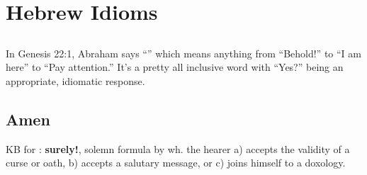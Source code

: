 \section{Hebrew Idioms}\label{app:idioms}\thispagestyle{fancy}
\subsection{}
In Genesis 22:1, Abraham says ``'' which means anything from ``Behold!'' to ``I am here'' to ``Pay attention.'' It's a pretty all inclusive word with ``Yes?'' being an appropriate, idiomatic response.

\subsection{Amen}
KB for : \textbf{surely!}, solemn formula by wh\@. the hearer a) accepts the validity of a curse or oath, b) accepts a salutary message, or c) joins himself to a doxology.
